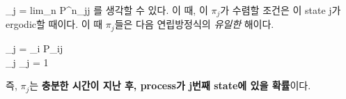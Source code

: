\documentclass[twoside]{article}
\theoremstyle{definition}
\newtheorem{ex}{Example}[section]
\newenvironment{eq}{\equation}{\endequation}
\newenvironment{eqs}{\eqnarray}{\endeqnarray}
\begin{document}
\begin{eq} 
\pi_j = lim_{n \rightarrow \infty} P^n_jj
\end{eq}
를 생각할 수 있다. 이 때, 이 $\pi_j$가 수렴할 조건은 이 state j가 ergodic할 때이다. 이 때 $\pi_j$들은 다음 연립방정식의 \textit{유일한} 해이다. 

\begin{eqs} 
\pi_j = \sum \pi_i P_{ij} \\ 
\sum_j \pi_j = 1
\end{eqs}

즉, $\pi_j$는 \textbf{충분한 시간이 지난 후, process가 j번째 state에 있을 확률}이다. %










\end{document}
